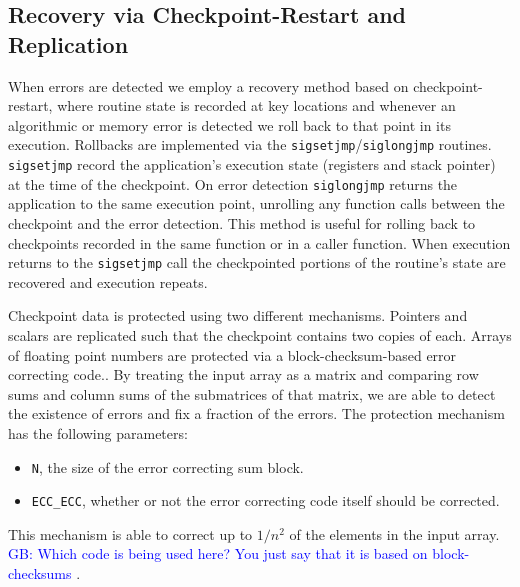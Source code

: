 \documentclass{sig-alternate}
\newcommand{\greg}[1]{%
  \textcolor{blue}{GB: #1}
}
\begin{document}
\subsection{Recovery via Checkpoint-Restart and Replication}
\label{sec:res_tech:cr}

When errors are detected we employ a recovery method based on checkpoint-restart, where routine state is recorded at key locations and whenever an algorithmic or memory error is detected we roll back to that point in its execution.
Rollbacks are implemented via the \texttt{sigsetjmp}/\texttt{siglongjmp} routines.
\texttt{sigsetjmp} record the application's execution state (registers and stack pointer) at the time of the checkpoint.
On error detection \texttt{siglongjmp} returns the application to the same execution point, unrolling any function calls between the checkpoint and the error detection.
This method is useful for rolling back to checkpoints recorded in the same function or in a caller function.
When execution returns to the \texttt{sigsetjmp} call the checkpointed portions of the routine's state are recovered and execution repeats.

Checkpoint data is protected using two different mechanisms.
Pointers and scalars are replicated such that the checkpoint contains two copies of each.
Arrays of floating point numbers are protected via a block-checksum-based error correcting code..
By treating the input array as a matrix and comparing row sums and column sums of the submatrices of that matrix, we are able to detect the existence of errors and fix a fraction of the errors.
The protection mechanism has the following parameters:
\begin{itemize}
\item{\texttt{N}, the size of the error correcting sum block.}
\item{\texttt{ECC\_ECC}, whether or not the error correcting code itself should be corrected.}
\end{itemize}
This mechanism is able to correct up to $1/{n^2}$ of the elements in the input array.
\greg{Which code is being used here? You just say that it is based on block-checksums}.
\end{document}

